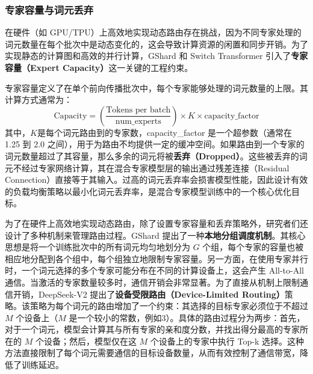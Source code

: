 \subsubsection{专家容量与词元丢弃}
在硬件（如 GPU/TPU）上高效地实现动态路由存在挑战，因为不同专家处理的词元数量在每个批次中是动态变化的，这会导致计算资源的闲置和同步开销。为了实现静态的计算图和高效的并行计算，GShard\cite{Lepikhin2020GShardSG} 和 Switch Transformer\cite{Fedus2021SwitchTS} 引入了\textbf{专家容量（Expert Capacity）}这一关键的工程约束。

专家容量定义了在单个前向传播批次中，每个专家能够处理的词元数量的上限。其计算方式通常为：
\begin{equation}
    \text{Capacity} = \left( \frac{\text{Tokens per batch}}{\text{num\_experts}} \right) \times K \times \text{capacity\_factor}
\end{equation}
其中，$K$是每个词元路由到的专家数，capacity\_factor 是一个超参数（通常在 1.25 到 2.0 之间），用于为路由不均提供一定的缓冲空间。如果路由到一个专家的词元数量超过了其容量，那么多余的词元将被\textbf{丢弃（Dropped）}。这些被丢弃的词元不经过专家网络计算，其在混合专家模型层的输出通过残差连接（Residual Connection）直接等于其输入。过高的词元丢弃率会损害模型性能，因此设计有效的负载均衡策略以最小化词元丢弃率，是混合专家模型训练中的一个核心优化目标。

为了在硬件上高效地实现动态路由，除了设置专家容量和丢弃策略外，研究者们还设计了多种机制来管理路由过程。GShard \cite{Lepikhin2020GShardSG} 提出了一种\textbf{本地分组调度机制}。其核心思想是将一个训练批次中的所有词元均匀地划分为 $G$ 个组，每个专家的容量也被相应地分配到各个组中，每个组独立地限制专家容量。另一方面，在使用专家并行时，一个词元选择的多个专家可能分布在不同的计算设备上，这会产生 All-to-All 通信。当激活的专家数量较多时，通信开销会非常显著。为了直接从机制上限制通信开销，DeepSeek-V2 \cite{DBLP:journals/corr/abs-2405-04434} 提出了\textbf{设备受限路由（Device-Limited Routing）}策略。该策略为每个词元的路由增加了一个约束：其选择的目标专家必须位于不超过 $M$ 个设备上（$M$ 是一个较小的常数，例如3）。具体的路由过程分为两步：首先，对于一个词元，模型会计算其与所有专家的亲和度分数，并找出得分最高的专家所在的 $M$ 个设备；然后，模型仅在这 $M$ 个设备上的专家中执行 Top-k 选择。这种方法直接限制了每个词元需要通信的目标设备数量，从而有效控制了通信带宽，降低了训练延迟。
